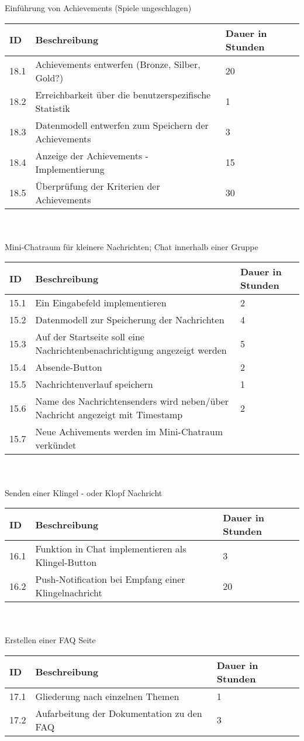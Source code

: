 Einführung von Achievements (Spiele ungeschlagen)\\
\begin{tabular}[h]{|p{1cm}|p{10cm}|p{3cm}|}
\hline 
ID & Beschreibung & Dauer in Stunden \\ \hline
18.1 & Achievements entwerfen (Bronze, Silber, Gold?) & 20 \\ \hline
18.2 & Erreichbarkeit über die benutzerspezifische Statistik & 1 \\ \hline
18.3 & Datenmodell entwerfen zum Speichern der Achievements & 3 \\ \hline
18.4 & Anzeige der Achievements - Implementierung & 15 \\ \hline
18.5 & Überprüfung der Kriterien der Achievements & 30 \\ \hline
\end{tabular}\\ \\
Mini-Chatraum für kleinere Nachrichten; Chat innerhalb einer Gruppe\\
\begin{tabular}[h]{|p{1cm}|p{10cm}|p{3cm}|}
\hline 
ID & Beschreibung & Dauer in Stunden \\ \hline
15.1 & Ein Eingabefeld implementieren & 2 \\ \hline
15.2 & Datenmodell zur Speicherung der Nachrichten & 4 \\ \hline
15.3 & Auf der Startseite soll eine Nachrichtenbenachrichtigung angezeigt werden & 5 \\ \hline
15.4 & Absende-Button & 2 \\ \hline
15.5 & Nachrichtenverlauf speichern & 1 \\ \hline
15.6 & Name des Nachrichtensenders wird neben/über Nachricht angezeigt mit Timestamp & 2 \\ \hline
15.7 & Neue Achivements werden im Mini-Chatraum verkündet & \\ \hline
\end{tabular}\\ \\
Senden einer Klingel - oder Klopf Nachricht\\
\begin{tabular}[h]{|p{1cm}|p{10cm}|p{3cm}|}
\hline 
ID & Beschreibung & Dauer in Stunden \\ \hline
16.1 & Funktion in Chat implementieren als Klingel-Button & 3 \\ \hline
16.2 & Push-Notification bei Empfang einer Klingelnachricht & 20 \\ \hline
\end{tabular}\\ \\
Erstellen einer FAQ Seite\\
\begin{tabular}[h]{|p{1cm}|p{10cm}|p{3cm}|}
\hline 
ID & Beschreibung & Dauer in Stunden \\ \hline
17.1 & Gliederung nach einzelnen Themen & 1	\\ \hline
17.2 & Aufarbeitung der Dokumentation zu den FAQ & 3 \\ \hline
\end{tabular}
\newpage

	
